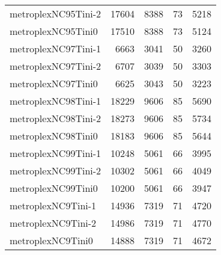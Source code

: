 \begin{longtable}{lrrrr}
metroplexNC95Tini-2 & 17604 & 8388 & 73 & 5218 \\
metroplexNC95Tini0 & 17510 & 8388 & 73 & 5124 \\
metroplexNC97Tini-1 & 6663 & 3041 & 50 & 3260 \\
metroplexNC97Tini-2 & 6707 & 3039 & 50 & 3303 \\
metroplexNC97Tini0 & 6625 & 3043 & 50 & 3223 \\
metroplexNC98Tini-1 & 18229 & 9606 & 85 & 5690 \\
metroplexNC98Tini-2 & 18273 & 9606 & 85 & 5734 \\
metroplexNC98Tini0 & 18183 & 9606 & 85 & 5644 \\
metroplexNC99Tini-1 & 10248 & 5061 & 66 & 3995 \\
metroplexNC99Tini-2 & 10302 & 5061 & 66 & 4049 \\
metroplexNC99Tini0 & 10200 & 5061 & 66 & 3947 \\
metroplexNC9Tini-1 & 14936 & 7319 & 71 & 4720 \\
metroplexNC9Tini-2 & 14986 & 7319 & 71 & 4770 \\
metroplexNC9Tini0 & 14888 & 7319 & 71 & 4672 \\
\end{longtable}
